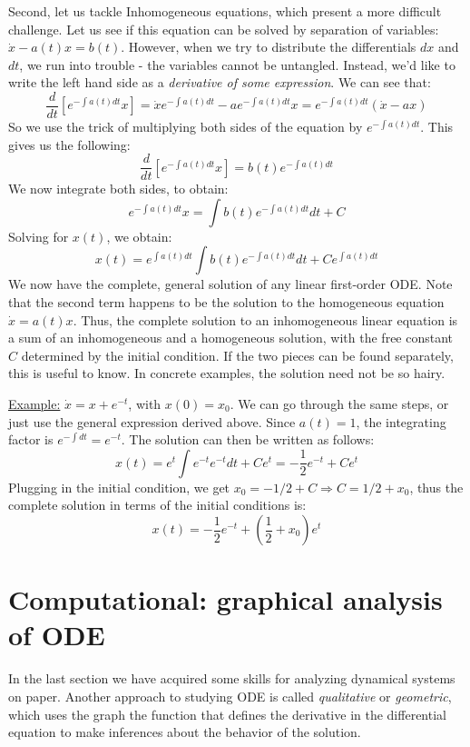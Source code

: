 \documentclass[11pt]{book}
\begin{document}
Second, let us tackle Inhomogeneous equations, which present a more difficult challenge.  Let us see if this equation can be solved by separation of variables: $\dot x -a(t)x = b(t)$. However, when we try to distribute the differentials $dx$ and $dt$, we run into trouble - the variables cannot be untangled. Instead, we'd like to write the left hand side as a \emph{derivative of some expression}. We can see that:
 $$\frac{d}{dt} \left[ e^{-\int a(t)dt}x \right] = \dot x e^{-\int a(t)dt} -ae^{-\int a(t)dt}x = e^{-\int a(t)dt}(\dot x -ax)$$ So we use the trick of multiplying both sides of the equation by $e^{-\int a(t)dt}$. This gives us the following:
 $$ \frac{d}{dt} \left[ e^{-\int a(t)dt}x \right]  = b(t)e^{-\int a(t)dt} $$
 We now integrate both sides, to obtain:
 $$  e^{-\int a(t)dt}x  = \int {b(t)}e^{-\int a(t)dt}dt + C$$
Solving for $x(t)$, we obtain:
\begin{equation}
x(t) =  e^{\int a(t)dt}\int {b(t)}e^{-\int a(t)dt}dt + Ce^{\int a(t)dt}
\end{equation}
We now have the complete, general solution of any linear first-order ODE. Note that the second term happens to be the solution to the homogeneous equation $\dot x = a(t)x$. Thus, the complete solution to an inhomogeneous linear equation is a sum of an inhomogeneous and a homogeneous solution, with the free constant $C$ determined by the initial condition. If the two pieces can be found separately, this is useful to know. In concrete examples, the solution need not be so hairy.

\underline{Example:} $\dot x = x + e^{-t}$, with $x(0) = x_0$. We can go through the same steps, or just use the general expression derived above. Since $a(t) = 1$, the integrating factor is $e^{-\int dt} = e^{-t}$. The solution can then be written as follows:
$$ x(t) = e^t \int e^{-t} e^{-t} dt + Ce^{t} = -\frac{1}{2}e^{-t} + Ce^{t}$$
Plugging in the initial condition, we get $x_0 = -1/2+C \Rightarrow C = 1/2+x_0$, thus the complete solution in terms of the initial conditions is:
\begin{equation}
x(t) =  -\frac{1}{2}e^{-t} + (\frac{1}{2}+x_0)e^{t}
\end{equation}

\section[Graphical analysis of ODE]{Computational: graphical analysis of ODE}
In the last section we have acquired some skills for analyzing dynamical systems on paper. Another approach to studying ODE is called \emph{qualitative} or \emph{geometric}, which uses the graph the function that defines the derivative in the differential equation to make inferences about the behavior of the solution.
\end{document}
